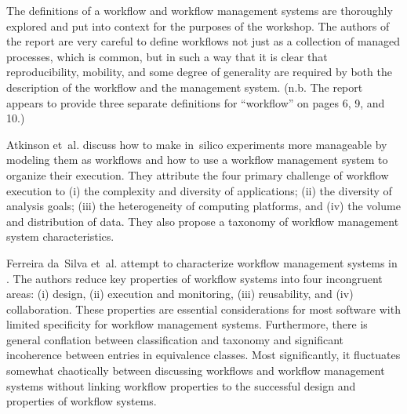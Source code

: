The definitions of a workflow and workflow management systems are
thoroughly explored and put into context for the purposes of the workshop. The
authors of the report are very careful to define workflows not just as a
collection of managed processes, which is common, but in such a way that it is
clear that reproducibility, mobility, and some degree of generality are required
by both the description of the workflow and the management system. (n.b. The
report appears to provide three separate definitions for ``workflow'' on pages
6, 9, and 10.)


Atkinson et~al. \cite{atkinson-csur} discuss how to make in~silico
experiments more manageable by modeling them as workflows and how to use a
workflow management system to organize their execution. They attribute the four
primary challenge  of workflow execution to (i) the complexity and diversity of
applications; (ii) the diversity of analysis goals; (iii) the heterogeneity of
computing platforms, and (iv) the volume and distribution of data. They also
propose a taxonomy of workflow management system characteristics.

Ferreira da~Silva et~al. attempt to characterize workflow management systems in
\cite{ferreira_da_silva_characterization_nodate}. The authors reduce key
properties of workflow systems into four incongruent areas: (i) design, (ii)
execution and monitoring, (iii) reusability, and (iv) collaboration. These
properties are essential considerations for most  software with limited
specificity for workflow management systems. Furthermore, there is general
conflation between classification and taxonomy and significant incoherence
between entries in equivalence classes. Most significantly, it fluctuates
somewhat chaotically between discussing workflows and workflow management
systems without linking workflow properties to the successful design and properties
of workflow systems.
